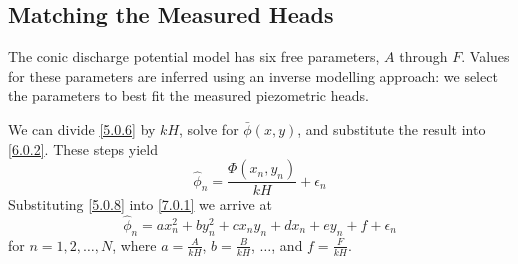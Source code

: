 \documentclass[12pt]{report}
\begin{document}
\subsection{Matching the Measured Heads}
The conic discharge potential model has six free parameters, $A$ through $F$.  Values for these parameters are inferred using an inverse modelling approach: we select the parameters to best fit the measured piezometric heads.

We can divide \eqref{5.0.6} by $kH$, solve for $\bar{\phi}(x,y)$, and substitute the result into \eqref{6.0.2}. These steps yield
%
\begin{equation}\label{7.0.1}
    \hat{\phi}_n = \frac{\Phi(x_n, y_n)}{kH} + \epsilon_n
\end{equation}
%
Substituting \eqref{5.0.8} into \eqref{7.0.1} we arrive at
%
\begin{equation} \label{7.0.2}
    \hat{\phi}_n = a x_n^2 + b y_n^2 + c x_n y_n + d x_n + e y_n + f + \epsilon_n
\end{equation}
%
for $n = 1, 2, \ldots, N$, where $a = \frac{A}{kH}$, $b = \frac{B}{kH}$, $ \ldots$, and $f = \frac{F}{kH}$.

\end{document}
